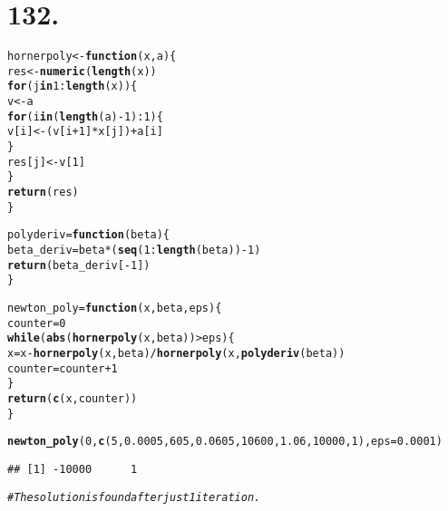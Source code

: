 \documentclass{article}\usepackage[]{graphicx}\usepackage[]{color}
\makeatletter
\newcommand{\hlnum}[1]{\textcolor[rgb]{0.686,0.059,0.569}{#1}}%
\newcommand{\hlcom}[1]{\textcolor[rgb]{0.678,0.584,0.686}{\textit{#1}}}%
\newcommand{\hlopt}[1]{\textcolor[rgb]{0,0,0}{#1}}%
\newcommand{\hlstd}[1]{\textcolor[rgb]{0.345,0.345,0.345}{#1}}%
\newcommand{\hlkwa}[1]{\textcolor[rgb]{0.161,0.373,0.58}{\textbf{#1}}}%
\newcommand{\hlkwb}[1]{\textcolor[rgb]{0.69,0.353,0.396}{#1}}%
\newcommand{\hlkwc}[1]{\textcolor[rgb]{0.333,0.667,0.333}{#1}}%
\newcommand{\hlkwd}[1]{\textcolor[rgb]{0.737,0.353,0.396}{\textbf{#1}}}%
\newenvironment{kframe}{%
 \def\at@end@of@kframe{}%
 \ifinner\ifhmode%
  \def\at@end@of@kframe{\end{minipage}}%
  \begin{minipage}{\columnwidth}%
 \fi\fi%
 \def\FrameCommand##1{\hskip\@totalleftmargin \hskip-\fboxsep
 \colorbox{shadecolor}{##1}\hskip-\fboxsep
     \hskip-\linewidth \hskip-\@totalleftmargin \hskip\columnwidth}%
 \MakeFramed {\advance\hsize-\width
   \@totalleftmargin\z@ \linewidth\hsize
   \@setminipage}}%
 {\par\unskip\endMakeFramed%
 \at@end@of@kframe}
\newenvironment{knitrout}{}{} %
\makeatother
\begin{document}
\section{132.}
\begin{knitrout}
\color{fgcolor}\begin{kframe}
\begin{alltt}
\hlstd{hornerpoly} \hlkwb{<-} \hlkwa{function}\hlstd{(}\hlkwc{x}\hlstd{,}\hlkwc{a}\hlstd{) \{}
  \hlstd{res} \hlkwb{<-} \hlkwd{numeric}\hlstd{(}\hlkwd{length}\hlstd{(x))}
  \hlkwa{for}\hlstd{(j} \hlkwa{in} \hlnum{1}\hlopt{:}\hlkwd{length}\hlstd{(x)) \{}
    \hlstd{v} \hlkwb{<-} \hlstd{a}
    \hlkwa{for}\hlstd{(i} \hlkwa{in} \hlstd{(}\hlkwd{length}\hlstd{(a)}\hlopt{-}\hlnum{1}\hlstd{)}\hlopt{:}\hlnum{1}\hlstd{) \{}
      \hlstd{v[i]} \hlkwb{<-} \hlstd{(v[i}\hlopt{+}\hlnum{1}\hlstd{]}\hlopt{*}\hlstd{x[j])} \hlopt{+} \hlstd{a[i]}
    \hlstd{\}}
    \hlstd{res[j]}\hlkwb{<-}\hlstd{v[}\hlnum{1}\hlstd{]}
  \hlstd{\}}
  \hlkwd{return}\hlstd{(res)}
\hlstd{\}}

\hlstd{polyderiv}\hlkwb{=}\hlkwa{function}\hlstd{(}\hlkwc{beta}\hlstd{)\{}
  \hlstd{beta_deriv}\hlkwb{=}\hlstd{beta}\hlopt{*}\hlstd{(}\hlkwd{seq}\hlstd{(}\hlnum{1}\hlopt{:}\hlkwd{length}\hlstd{(beta))}\hlopt{-}\hlnum{1}\hlstd{)}
  \hlkwd{return}\hlstd{(beta_deriv[}\hlopt{-}\hlnum{1}\hlstd{])}
\hlstd{\}}

\hlstd{newton_poly} \hlkwb{=} \hlkwa{function}\hlstd{(}\hlkwc{x}\hlstd{,} \hlkwc{beta}\hlstd{,} \hlkwc{eps}\hlstd{)\{}
  \hlstd{counter} \hlkwb{=} \hlnum{0}
  \hlkwa{while}\hlstd{(}\hlkwd{abs}\hlstd{(}\hlkwd{hornerpoly}\hlstd{(x, beta))}\hlopt{>}\hlstd{eps)\{}
    \hlstd{x} \hlkwb{=} \hlstd{x}\hlopt{-}\hlkwd{hornerpoly}\hlstd{(x, beta)}\hlopt{/}\hlkwd{hornerpoly}\hlstd{(x,} \hlkwd{polyderiv}\hlstd{(beta))}
    \hlstd{counter} \hlkwb{=} \hlstd{counter} \hlopt{+} \hlnum{1}
  \hlstd{\}}
  \hlkwd{return}\hlstd{(}\hlkwd{c}\hlstd{(x, counter))}
\hlstd{\}}

\hlkwd{newton_poly}\hlstd{(}\hlnum{0}\hlstd{,} \hlkwd{c}\hlstd{(}\hlnum{5}\hlstd{,} \hlnum{0.0005}\hlstd{,} \hlnum{605}\hlstd{,} \hlnum{0.0605}\hlstd{,} \hlnum{10600}\hlstd{,} \hlnum{1.06}\hlstd{,} \hlnum{10000}\hlstd{,} \hlnum{1}\hlstd{),} \hlkwc{eps}\hlstd{=}\hlnum{0.0001}\hlstd{)}
\end{alltt}
\begin{verbatim}
## [1] -10000      1
\end{verbatim}
\begin{alltt}
\hlcom{#The solution is found after just 1 iteration.}
\end{alltt}
\end{kframe}
\end{knitrout}
\end{document}
